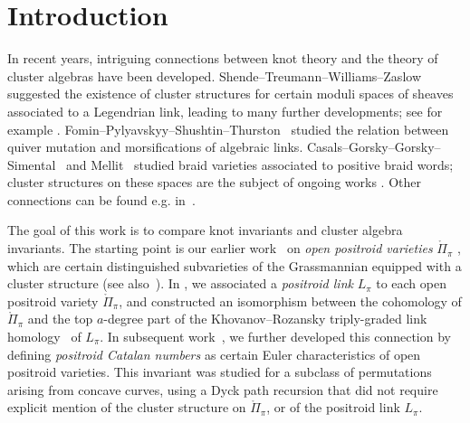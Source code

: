 \documentclass[11pt]{article}
\theoremstyle{definition}
\newcommand{\equalenv}[2]{\expandafter\let\csname#1\expandafter\endcsname\csname#2\endcsname\expandafter\let\csname end#1\expandafter\endcsname\csname end#2\endcsname}
\numberwithin{equation}{section}
\newcommand{\Povar}{\mathring{\Pi}}
\newcommand\fp{\pi}
\begin{document}


\section{Introduction}
%
%
In recent years, intriguing connections between knot theory and the theory of cluster algebras have been developed.  Shende--Treumann--Williams--Zaslow~\cite{STWZ} suggested the existence of cluster structures for certain moduli spaces of sheaves associated to a Legendrian link, leading to many further developments; see for example \cite{SW,CG,CW}.  Fomin--Pylyavskyy--Shushtin--Thurston~\cite{FPST} studied the relation between quiver mutation and morsifications of algebraic links.  Casals--Gorsky--Gorsky--Simental~\cite{CGGS} and Mellit~\cite{Mellit_Cell} studied braid varieties associated to positive braid words; cluster structures on these spaces are the subject of ongoing works \cite{CGGLSS,GLSBS1,GLSBS2}. Other connections can be found e.g. in~\cite{HiIn,Muller_skein,LeeSch,BMS}.
%

The goal of this work is to compare knot invariants and cluster algebra invariants.  The starting point is our earlier work~\cite{GL_qtcat} on \emph{open positroid varieties} $\Povar_\fp$ \cite{KLS}, which are certain distinguished subvarieties of the Grassmannian equipped with a cluster structure \cite{GL_cluster} (see also~\cite{Scott,MSLA,Lec,SSBW}).  In \cite{GL_qtcat}, we associated a \emph{positroid link} $L_\fp$ to each open positroid variety $\Povar_\fp$, and constructed an isomorphism between the cohomology of $\Povar_\fp$ and the top $a$-degree part of the Khovanov--Rozansky triply-graded link homology~\cite{KR1,KR2,KhoSoe} of $L_\fp$.   In subsequent work~\cite{GL_cat_combin}, we further developed this connection by defining \emph{positroid Catalan numbers} as certain Euler characteristics of open positroid varieties.  This invariant was studied for a subclass of permutations arising from concave curves, using a Dyck path recursion that did not require explicit mention of the cluster structure on $\Povar_\fp$, or of the positroid link $L_\fp$.
\end{document}

